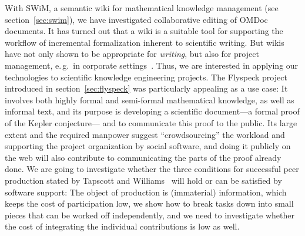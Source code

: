 With SWiM, a semantic wiki for mathematical knowledge management (see
section~\ref{sec:swim}), we have investigated collaborative editing of OMDoc documents.
It has turned out that a wiki is a suitable tool for supporting the workflow of
incremental formalization inherent to scientific writing.  But wikis have not only shown
to be appropriate for \emph{writing}, but also for project management, e.\,g.\ in
corporate settings~\cite{leuf01:wikiway}.  Thus, we are interested in applying our
technologies to scientific knowledge engineering projects.  The Flyspeck project
introduced in section~\ref{sec:flyspeck} was particularly appealing as a use case: It
involves both highly formal and semi-formal mathematical knowledge, as well as informal
text, and its purpose is developing a scientific document---a formal proof of the Kepler
conjecture--- and to communicate this proof to the public.  Its large extent and the
required manpower suggest ``crowdsourcing'' the workload and supporting the project
organization by social software, and doing it publicly on the web will also contribute to
communicating the parts of the proof already done.  We are going to investigate whether
the three conditions for successful peer production stated by Tapscott and
Williams~\cite{wikinomics} will hold or can be satisfied by software support: The object of production is (immaterial) information, which
keeps the cost of participation low, we show how to break tasks down into small
pieces that can be worked
off independently, and we need to investigate whether the cost of integrating the
individual contributions is low as well.

